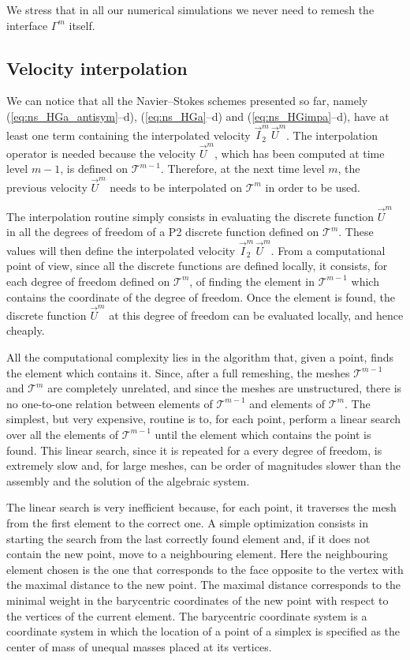 \documentclass[a4paper,12pt,onecolumn]{article}
\begin{document}
We stress that in all our numerical simulations we never need to remesh the
interface $\Gamma^m$ itself.

\subsection{Velocity interpolation}\label{sec:velocity_interpolation}
We can notice that all the Navier--Stokes schemes presented so far, namely
(\ref{eq:ns_HGa_antisym}--d), (\ref{eq:ns_HGa}--d) and
(\ref{eq:ns_HGimpa}--d), have at least one term containing the
interpolated velocity $\vec I^m_2\,\vec U^m$. The interpolation operator is
needed because the velocity $\vec U^m$, which has been computed at time level
$m-1$, is defined on $\mathcal{T}^{m-1}$. Therefore, at the next time level
$m$, the previous velocity $\vec U^m$ needs to be interpolated on
$\mathcal{T}^m$ in order to be used.

The interpolation routine simply consists in evaluating the discrete function
$\vec U^m$ in all the degrees of freedom of a P2 discrete function defined on
$\mathcal{T}^m$. These values will then define the interpolated velocity
$\vec I^m_2\,\vec U^m$. From a computational point of view, since all the
discrete functions are defined locally, it consists, for each degree of
freedom defined on $\mathcal{T}^m$, of finding the element in
$\mathcal{T}^{m-1}$ which contains the coordinate of the degree of freedom.
Once the element is found, the discrete function $\vec U^m$ at this degree of
freedom can be evaluated locally, and hence cheaply.

All the computational complexity lies in the algorithm that, given a point,
finds the element which contains it. Since, after a full remeshing, the meshes
$\mathcal{T}^{m-1}$ and $\mathcal{T}^m$ are completely unrelated, and since the
meshes are unstructured, there is no one-to-one relation between elements of
$\mathcal{T}^{m-1}$ and elements of $\mathcal{T}^m$. The simplest, but very
expensive, routine is to, for each point, perform a linear search over all the
elements of $\mathcal{T}^{m-1}$ until the element which contains the point is
found. This linear search, since it is repeated for a every degree of freedom,
is extremely slow and, for large meshes, can be order of magnitudes slower
than the assembly and the solution of the algebraic system.

The linear search is very inefficient because, for each point, it traverses the
mesh from the first element to the correct one. A simple optimization consists
in starting the search from the last correctly found element and, if it does not
contain the new point, move to a neighbouring element. Here the neighbouring
element chosen is the one that corresponds to the face opposite to the vertex
with the maximal distance to the new point. The maximal distance corresponds to
the minimal weight in the barycentric coordinates of the new point with respect
to the vertices of the current element. The barycentric coordinate system is a
coordinate system in which the location of a point of a simplex is specified as
the center of mass of unequal masses placed at its vertices.
\end{document}
